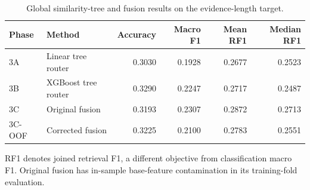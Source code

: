 \begin{table}[htbp]
\centering\small
\caption{Global similarity-tree and fusion results on the evidence-length target.}
\label{tab:tree_results}
\begin{tabular}{@{}llrrrr@{}}
\toprule
Phase & Method & Accuracy & Macro F1 & Mean RF1 & Median RF1\\
\midrule
3A & Linear tree router & 0.3030 & 0.1928 & 0.2677 & 0.2523\\
3B & XGBoost tree router & 0.3290 & 0.2247 & 0.2717 & 0.2487\\
3C & Original fusion & 0.3193 & 0.2307 & 0.2872 & 0.2713\\
3C-OOF & Corrected fusion & 0.3225 & 0.2100 & 0.2783 & 0.2551\\
\bottomrule
\end{tabular}
\par\smallskip\begin{minipage}{\textwidth}\footnotesize RF1 denotes joined retrieval F1, a different objective from classification macro F1. Original fusion has in-sample base-feature contamination in its training-fold evaluation.\end{minipage}
\end{table}
